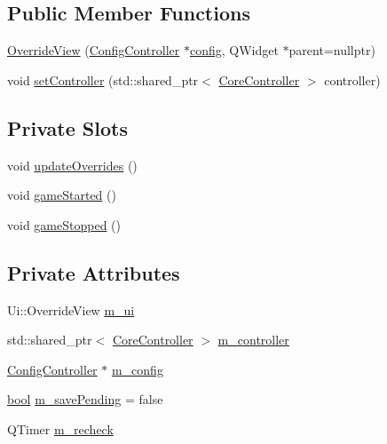 \subsection*{Public Member Functions}
\begin{DoxyCompactItemize}
\item 
\mbox{\hyperlink{class_q_g_b_a_1_1_override_view_aeffecd39b66b4c445a1d88f13d64ac78}{Override\+View}} (\mbox{\hyperlink{class_q_g_b_a_1_1_config_controller}{Config\+Controller}} $\ast$\mbox{\hyperlink{deflate_8c_a4473b5227787415097004fd39f55185e}{config}}, Q\+Widget $\ast$parent=nullptr)
\item 
void \mbox{\hyperlink{class_q_g_b_a_1_1_override_view_a2f0259e94cf4e7bcbc51f84e84c24574}{set\+Controller}} (std\+::shared\+\_\+ptr$<$ \mbox{\hyperlink{class_q_g_b_a_1_1_core_controller}{Core\+Controller}} $>$ controller)
\end{DoxyCompactItemize}
\subsection*{Private Slots}
\begin{DoxyCompactItemize}
\item 
void \mbox{\hyperlink{class_q_g_b_a_1_1_override_view_a70619d8bcae2e4941a0d0c35d4c5bb59}{update\+Overrides}} ()
\item 
void \mbox{\hyperlink{class_q_g_b_a_1_1_override_view_a0c94739bda5d5540784d4f1f72c88805}{game\+Started}} ()
\item 
void \mbox{\hyperlink{class_q_g_b_a_1_1_override_view_a4b01ad226af53be0d7454647e3a1c4ea}{game\+Stopped}} ()
\end{DoxyCompactItemize}
\subsection*{Private Attributes}
\begin{DoxyCompactItemize}
\item 
Ui\+::\+Override\+View \mbox{\hyperlink{class_q_g_b_a_1_1_override_view_ad087a8daddb6ae2c8806e6d352a3192e}{m\+\_\+ui}}
\item 
std\+::shared\+\_\+ptr$<$ \mbox{\hyperlink{class_q_g_b_a_1_1_core_controller}{Core\+Controller}} $>$ \mbox{\hyperlink{class_q_g_b_a_1_1_override_view_acfa48c2030bb1694b38b318cc852e681}{m\+\_\+controller}}
\item 
\mbox{\hyperlink{class_q_g_b_a_1_1_config_controller}{Config\+Controller}} $\ast$ \mbox{\hyperlink{class_q_g_b_a_1_1_override_view_a884730d1bbe91ec4ddb7d15040a59a42}{m\+\_\+config}}
\item 
\mbox{\hyperlink{libretro_8h_a4a26dcae73fb7e1528214a068aca317e}{bool}} \mbox{\hyperlink{class_q_g_b_a_1_1_override_view_ac1d726e965ec00eaee7d25e83d26689d}{m\+\_\+save\+Pending}} = false
\item 
Q\+Timer \mbox{\hyperlink{class_q_g_b_a_1_1_override_view_a9f77999befe531e4d2f594c06d153c09}{m\+\_\+recheck}}
\end{DoxyCompactItemize}


